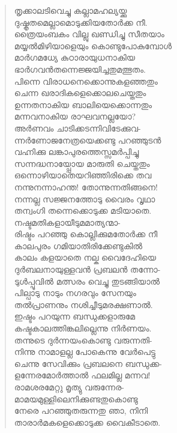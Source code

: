 \begin{verse}
തൃക്കാലടിവെച്ചു കല്ലാമഹല്യയ്ക്കു\\
ദുഷ്കൃതമെല്ലാമൊടുക്കിയതോര്‍ക്ക നീ.\\
ത്രൈയംബകം വില്ലു ഖണ്ഡിച്ചു സീതയാം\\
മയ്യല്‍മിഴിയാളെയും കൊണ്ടുപോകുമ്പോള്‍\\
മാര്‍ഗമധ്യേ കുഠാരായുധനാകിയ\\
ഭാര്‍ഗവന്‍തന്നെജ്ജയിച്ചതുമത്ഭുതം.\\
പിന്നെ വിരാധനെക്കൊന്നുകളഞ്ഞതും\\
ചെന്ന ഖരാദികളെക്കൊലചെയ്തതും\\
ഉന്നതനാകിയ ബാലിയെക്കൊന്നതും\\
മന്നവനാകിയ രാഘവനല്ലയോ?\\
അര്‍ണവം ചാടിക്കടന്നിവിടേക്കുവ-\\
ന്നര്‍ണോജനേത്രയെക്കണ്ടു പറഞ്ഞുടന്‍\\
വഹ്നിക്കു ലങ്കാപുരത്തെസ്സമര്‍പ്പിച്ചു\\
സന്നദ്ധനായ്പ്പോയ മാരുതി ചെയ്തതും\\
ഒന്നൊഴിയാതെയറിഞ്ഞിരിക്കെ തവ\\
നന്നുനന്നാഹന്ത! തോന്നുന്നതിങ്ങനെ!\\
നന്നല്ല സജ്ജനത്തോടു വൈരം വൃഥാ\\
തന്വംഗി തന്നെക്കൊടുക്ക മടിയാതെ.\\
നഷ്ടമതികളായീടുമമാത്യന്മാ-\\
രിഷ്ടം പറഞ്ഞു കൊല്ലിക്കുമതോര്‍ക്ക നീ\\
കാലപുരം ഗമിയാതിരിക്കേണ്ടുകില്‍\\
കാലം കളയാതെ നല്ക വൈദേഹിയെ\\
ദുര്‍ബലനായുള്ളവന്‍ പ്രബലന്‍ തന്നോ-\\
ടുള്‍പ്പൂവില്‍ മത്സരം വെച്ചു തുടങ്ങിയാല്‍\\
പില്പാടു നാടും നഗരവും സേനയും\\
തല്‍പ്രാണനും നശിച്ചീടുമരക്ഷണാല്‍.\\
ഇഷ്ടം പറയുന്ന ബന്ധുക്കളാരുമേ\\
കഷ്ടകാലത്തിങ്കലില്ലെന്നു നിര്‍ണയം.\\
തന്നുടെ ദുര്‍ന്നയംകൊണ്ടു വരുന്നതി-\\
നിന്നു നാമാളല്ല പോകെന്നു വേര്‍പെട്ടു\\
ചെന്നു സേവിക്കും പ്രബലനെ ബന്ധുക്ക-\\
ളന്നേരമോര്‍ത്താല്‍ ഫലമില്ല മന്നവ!\\
രാമശരമേറ്റു മൃത്യു വരുന്നേര-\\
മാമയമുള്ളിലെനിക്കുണ്ടതുകൊണ്ടു\\
നേരെ പറഞ്ഞുതരുന്നതു ഞാ, നിനി\\
താരാര്‍മകളെക്കൊടുക്ക വൈകീടാതെ.\\

\end{verse}
